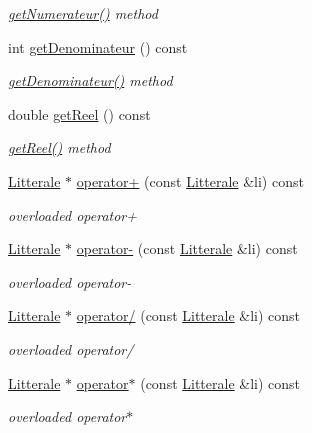 \begin{DoxyCompactItemize}
\begin{DoxyCompactList}\small\item\em \hyperlink{class_li_entiere_af07e732cc94ac20f64d62031fe54cd06}{get\+Numerateur()} method \end{DoxyCompactList}\item 
int \hyperlink{class_li_entiere_aed4e11ecdfc99dfaba9f41e460ef71fb}{get\+Denominateur} () const 
\begin{DoxyCompactList}\small\item\em \hyperlink{class_li_entiere_aed4e11ecdfc99dfaba9f41e460ef71fb}{get\+Denominateur()} method \end{DoxyCompactList}\item 
double \hyperlink{class_li_entiere_aa43ad42052b2adc31ff3b64cf541d8d7}{get\+Reel} () const 
\begin{DoxyCompactList}\small\item\em \hyperlink{class_li_entiere_aa43ad42052b2adc31ff3b64cf541d8d7}{get\+Reel()} method \end{DoxyCompactList}\item 
\hyperlink{class_litterale}{Litterale} $\ast$ \hyperlink{class_li_entiere_a9dd8dc1327e46ea3486d02520c5d85c8}{operator+} (const \hyperlink{class_litterale}{Litterale} \&li) const 
\begin{DoxyCompactList}\small\item\em overloaded operator+ \end{DoxyCompactList}\item 
\hyperlink{class_litterale}{Litterale} $\ast$ \hyperlink{class_li_entiere_a5b1f7fd5e9064c96c1b260a740f6b425}{operator-\/} (const \hyperlink{class_litterale}{Litterale} \&li) const 
\begin{DoxyCompactList}\small\item\em overloaded operator-\/ \end{DoxyCompactList}\item 
\hyperlink{class_litterale}{Litterale} $\ast$ \hyperlink{class_li_entiere_a27d5f34f659e44b29d30f28aeda4db42}{operator/} (const \hyperlink{class_litterale}{Litterale} \&li) const 
\begin{DoxyCompactList}\small\item\em overloaded operator/ \end{DoxyCompactList}\item 
\hyperlink{class_litterale}{Litterale} $\ast$ \hyperlink{class_li_entiere_a976f7f29b27e02770a8efc6278da4255}{operator$\ast$} (const \hyperlink{class_litterale}{Litterale} \&li) const 
\begin{DoxyCompactList}\small\item\em overloaded operator$\ast$ \end{DoxyCompactList}\item 

\end{DoxyCompactItemize}
